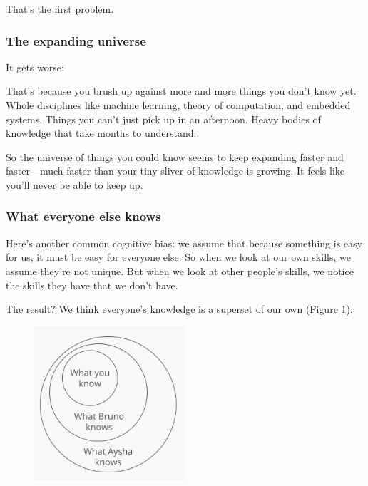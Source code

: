 \documentclass{article}
\begin{document}
 

That’s the first problem. 


\subsubsection{The expanding universe}

It gets worse: 

That's because you brush up against more and more things you don’t know yet. Whole disciplines like machine learning, theory of computation, and embedded systems. Things you can't just pick up in an afternoon. Heavy bodies of knowledge that take months to understand.

So the universe of things you could know seems to keep expanding faster and faster—much faster than your tiny sliver of knowledge is growing. It feels like you'll never be able to keep up.


\subsubsection{What everyone else knows}

Here's another common cognitive bias: we assume that because something is easy for us, it must be easy for everyone else. So when we look at our own skills, we assume they're not unique. But when we look at other people's skills, we notice the skills they have that we don't have.

The result? We think everyone’s knowledge is a superset of our own (Figure \ref{fig:false-what-everyone-else-know}):

\begin{figure}[!ht]
  \centering
  \includegraphics[width=0.5\textwidth]{pics/false-what-everyone-else-know}
  \label{fig:false-what-everyone-else-know}
\end{figure}
\end{document}
